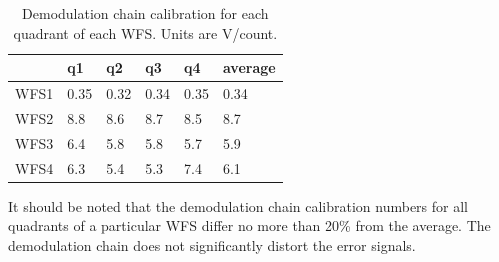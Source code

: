 \begin{table}
\centering
\caption[Demodulation chain calibration for each quadrant of each
 WFS]{Demodulation chain calibration for each quadrant of each
 WFS. Units are \micro V/count.}
\begin{tabular}{l l l l l l}
\hline
 & q1 & q2 & q3 & q4 & average \\
\hline
 WFS1  & 0.35 &   0.32 &   0.34 &   0.35 & 0.34 \\
 WFS2  & 8.8 &   8.6 &   8.7  &  8.5 & 8.7       \\
 WFS3  & 6.4 &   5.8 &   5.8 &   5.7 & 5.9     \\
 WFS4  & 6.3 &   5.4 &   5.3  &  7.4 & 6.1    \\
\hline
\end{tabular}
\label{table:demodcal}
\end{table}

It should be noted that the demodulation chain calibration numbers for
all quadrants of a particular WFS differ no more than 20\% from the
average. The demodulation chain does not significantly distort the
error signals.








